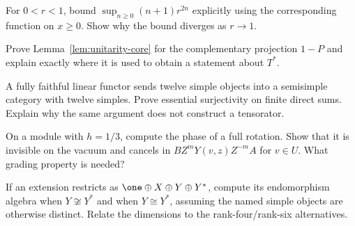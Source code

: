 \begin{exercise}\label{ex:unitarity-damping}
For $0<r<1$, bound $\sup_{n\ge0}(n+1)r^{2n}$ explicitly using
the corresponding function on $x\ge0$. Show why the bound diverges
as $r\to1$.

\par\smallskip{}\par
\end{exercise}

\begin{exercise}\label{ex:unitarity-projector}
Prove Lemma~\ref{lem:unitarity-core} for the complementary
projection $1-P$ and explain exactly where it is used to obtain
a statement about $T^*$.

\par\smallskip{}\par
\end{exercise}

\begin{exercise}\label{ex:unitarity-counting}
A fully faithful linear functor sends twelve simple objects into a
semisimple category with twelve simples. Prove essential
surjectivity on finite direct sums. Explain why the same argument
does not construct a tensorator.

\par\smallskip{}\par
\end{exercise}

\begin{exercise}\label{ex:unitarity-deck}
On a module with $h=1/3$, compute the phase of a full rotation.
Show that it is invisible on the vacuum and cancels in
$BZ^mY(v,z)Z^{-m}A$ for $v\in U$. What grading property is needed?

\par\smallskip{}\par
\end{exercise}

\begin{exercise}\label{ex:unitarity-end}
If an extension restricts as
$\one\oplus X\oplus Y\oplus Y^*$, compute its endomorphism
algebra when $Y\not\cong Y^*$ and when $Y\cong Y^*$, assuming
the named simple objects are otherwise distinct. Relate the
dimensions to the rank-four/rank-six alternatives.

\par\smallskip{}\par
\end{exercise}
